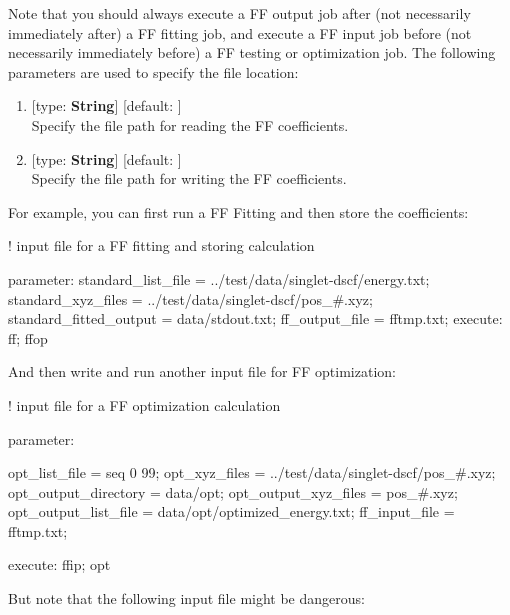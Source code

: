 \documentclass[11pt]{book}
\begin{document}
Note that you should always execute a FF output job after (not necessarily immediately after) a FF fitting job, and execute a FF input job before 
(not necessarily immediately before) a FF testing or optimization job. The following parameters are used to specify the file location:

\begin{enumerate}
\item {} [type: \textbf{String}] [default: ] \\
	Specify the file path for reading the FF coefficients.
\item {} [type: \textbf{String}] [default: ] \\
	Specify the file path for writing the FF coefficients.
\end{enumerate}

For example, you can first run a FF Fitting and then store the coefficients:

\begin{everbatim}

! input file for a FF fitting and storing calculation

{ parameter: 
   standard_list_file     = ../test/data/singlet-dscf/energy.txt;
   standard_xyz_files     = ../test/data/singlet-dscf/pos_#.xyz;
   standard_fitted_output = data/stdout.txt;
   ff_output_file         = fftmp.txt;
}
{ execute: ff; ffop }

\end{everbatim}

And then write and run another input file for FF optimization:

\begin{everbatim}

! input file for a FF optimization calculation

{ parameter: 

   opt_list_file          = seq 0 99;
   opt_xyz_files          = ../test/data/singlet-dscf/pos_#.xyz;
   opt_output_directory   = data/opt;
   opt_output_xyz_files   = pos_#.xyz;
   opt_output_list_file   = data/opt/optimized_energy.txt;
   ff_input_file          = fftmp.txt;

}
{ execute: ffip; opt }

\end{everbatim}

But note that the following input file might be dangerous:
\end{document}
